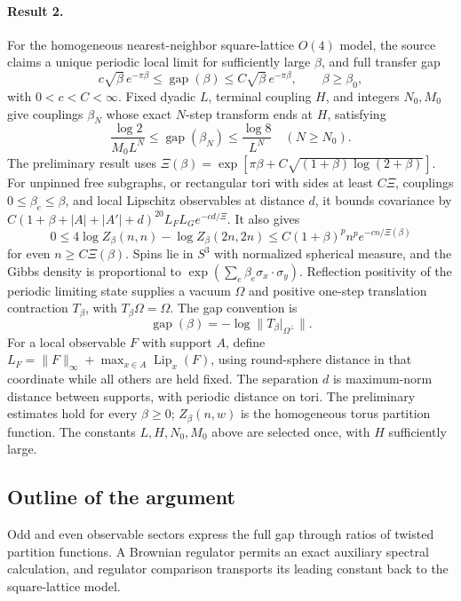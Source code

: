 \documentclass[11pt]{article}
\begin{document}
\paragraph{Result 2.} For the homogeneous nearest-neighbor square-lattice \(O(4)\) model, the source claims a unique periodic local limit for sufficiently large \(\beta\), and full transfer gap
\[
 c\sqrt\beta\,e^{-\pi\beta}\le\operatorname{gap}(\beta)
 \le C\sqrt\beta\,e^{-\pi\beta},\qquad\beta\ge\beta_0,
\]
with \(0<c<C<\infty\). Fixed dyadic \(L\), terminal coupling \(H\), and integers \(N_0,M_0\) give couplings \(\beta_N\) whose exact \(N\)-step transform ends at \(H\), satisfying
\[
 \frac{\log2}{M_0L^N}\le\operatorname{gap}(\beta_N)\le\frac{\log8}{L^N}\quad(N\ge N_0).
\]
The preliminary result uses \(\Xi(\beta)=\exp[\pi\beta+C\sqrt{(1+\beta)\log(2+\beta)}]\). For unpinned free subgraphs, or rectangular tori with sides at least \(C\Xi\), couplings \(0\le\beta_e\le\beta\), and local Lipschitz observables at distance \(d\), it bounds covariance by \(C(1+\beta+|A|+|A'|+d)^{20}L_FL_Ge^{-cd/\Xi}\). It also gives
\[
 0\le4\log Z_\beta(n,n)-\log Z_\beta(2n,2n)
 \le C(1+\beta)^pn^p e^{-cn/\Xi(\beta)}
\]
for even \(n\ge C\Xi(\beta)\). Spins lie in $S^3$ with normalized spherical measure, and the Gibbs density is proportional to $\exp(\sum_e\beta_e\sigma_x\cdot\sigma_y)$. Reflection positivity of the periodic limiting state supplies a vacuum $\Omega$ and positive one-step translation contraction $T_\beta$, with $T_\beta\Omega=\Omega$. The gap convention is
\[
 \operatorname{gap}(\beta)=-\log\|T_\beta|_{\Omega^\perp}\|.
\]
For a local observable $F$ with support $A$, define $L_F=\|F\|_\infty+\max_{x\in A}\operatorname{Lip}_x(F)$, using round-sphere distance in that coordinate while all others are held fixed. The separation $d$ is maximum-norm distance between supports, with periodic distance on tori. The preliminary estimates hold for every $\beta\ge0$; $Z_\beta(n,w)$ is the homogeneous torus partition function. The constants $L,H,N_0,M_0$ above are selected once, with $H$ sufficiently large.

\subsection{Outline of the argument}
Odd and even observable sectors express the full gap through ratios of twisted partition functions. A Brownian regulator permits an exact auxiliary spectral calculation, and regulator comparison transports its leading constant back to the square-lattice model.
\end{document}
